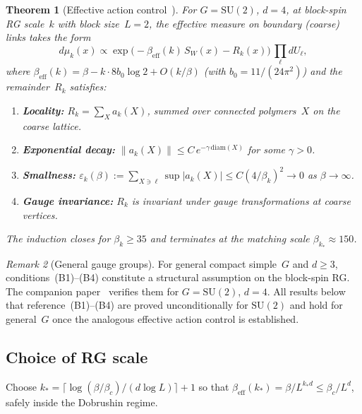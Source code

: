 \documentclass[11pt,a4paper]{article}
\theoremstyle{plain}
\newtheorem{theorem}{Theorem}[section]
\theoremstyle{definition}
\theoremstyle{remark}
\newtheorem{remark}[theorem]{Remark}
\newcommand{\SU}{\mathrm{SU}}
\newcommand{\diam}{\mathrm{diam}}
\begin{document}
\begin{theorem}[Effective action control~{\cite[Theorems~3,\,4]{FontesSU2}}]
\label{thm:eac}
For $G = \SU(2)$, $d = 4$, at block-spin RG scale~$k$ with
block size~$L = 2$, the effective
measure on boundary (coarse) links takes the form
\begin{equation}\label{eq:balaban}
  d\mu_k(x) \propto \exp\!\bigl(-\beta_{\mathrm{eff}}(k)
  \,S_W(x) - R_k(x)\bigr)\,\prod_\ell dU_\ell,
\end{equation}
where $\beta_{\mathrm{eff}}(k) = \beta - k\cdot 8b_0\log 2
+ O(k/\beta)$ (with $b_0 = 11/(24\pi^2)$)
and the remainder~$R_k$ satisfies:
\begin{enumerate}[label=\textup{(B\arabic*)},nosep]
  \item \textbf{Locality:} $R_k = \sum_X a_k(X)$, summed over
    connected polymers~$X$ on the coarse lattice.
  \item \textbf{Exponential decay:}
    $\|a_k(X)\| \leq C\,e^{-\gamma\,\diam(X)}$ for
    some $\gamma > 0$.
  \item \textbf{Smallness:}
    $\varepsilon_k(\beta) := \sum_{X \ni \ell}
    \sup|a_k(X)| \leq C(4/\beta_k)^2 \to 0$
    as $\beta \to \infty$.
  \item \textbf{Gauge invariance:} $R_k$ is invariant under
    gauge transformations at coarse vertices.
\end{enumerate}
The induction closes for $\beta_k \geq 35$ and terminates at the
matching scale $\beta_{k_*} \approx 150$.
\end{theorem}

\begin{remark}[General gauge groups]\label{rem:general-G}
For general compact simple~$G$ and $d \geq 3$,
conditions~(B1)--(B4) constitute a structural
assumption on the block-spin RG.  The companion
paper~\cite{FontesSU2} verifies them for $G = \SU(2)$,
$d = 4$.  All results below that reference~(B1)--(B4)
are proved unconditionally for $\SU(2)$ and hold for
general~$G$ once the analogous effective action control
is established.
\end{remark}

\subsection{Choice of RG scale}

Choose $k_* = \lceil \log(\beta / \beta_c)/(d\log L)\rceil + 1$
so that $\beta_{\mathrm{eff}}(k_*)
= \beta / L^{k_* d} \leq \beta_c / L^d$,
safely inside the Dobrushin regime.
\end{document}
